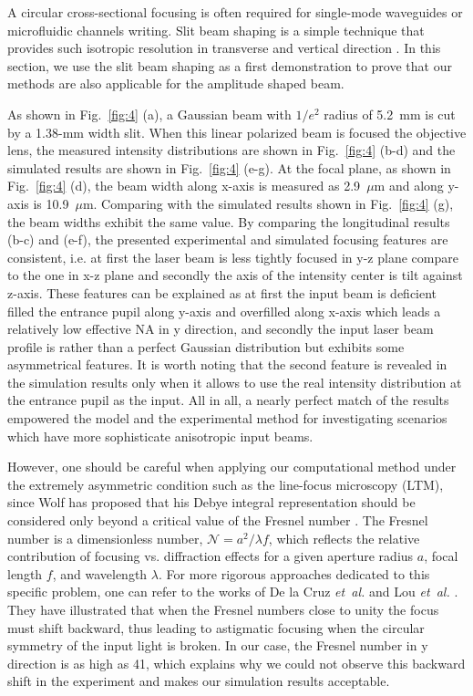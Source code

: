 \documentclass[9pt,twocolumn,twoside]{osajnl}
\begin{document}
A circular cross-sectional focusing is often required for single-mode waveguides or microfluidic channels writing. Slit beam shaping is a simple technique that provides such isotropic resolution in transverse and vertical direction \cite{cheng2003control, ams2005slit}. In this section, we use the slit beam shaping as a first demonstration to prove that our methods are also applicable for the amplitude shaped beam. 

As shown in Fig.~\ref{fig:4} (a), a Gaussian beam with $1/e^2$ radius of 5.2~mm is cut by a 1.38-mm width slit. When this linear polarized beam is focused the objective lens, the measured intensity distributions are shown in Fig.~\ref{fig:4} (b-d) and the simulated results are shown in Fig.~\ref{fig:4} (e-g). At the focal plane, as shown in Fig.~\ref{fig:4} (d), the beam width along x-axis is measured as 2.9~$\mu$m and along y-axis is 10.9~$\mu$m. Comparing with the simulated results shown in Fig.~\ref{fig:4} (g), the beam widths exhibit the same value. By comparing the longitudinal results (b-c) and (e-f), the presented experimental and simulated focusing features are consistent, i.e. at first the laser beam is less tightly focused in y-z plane compare to the one in x-z plane and secondly the axis of the intensity center is tilt against z-axis. These features can be explained as at first the input beam is deficient filled the entrance pupil along y-axis and overfilled along x-axis which leads a relatively low effective NA in y direction, and secondly the input laser beam profile is rather than a perfect Gaussian distribution but exhibits some asymmetrical features. It is worth noting that the second feature is revealed in the simulation results only when it allows to use the real intensity distribution at the entrance pupil as the input. All in all, a nearly perfect match of the results empowered the model and the experimental method for investigating scenarios which have more sophisticate anisotropic input beams. 

However, one should be careful when applying our computational method under the extremely asymmetric condition such as the line-focus microscopy (LTM), since Wolf has proposed that his Debye integral representation should be considered only beyond a critical value of the Fresnel number \cite{wolf1981conditions}. The Fresnel number is a dimensionless number, $\mathcal{N} = a^2/\lambda f$, which reflects the relative contribution of focusing vs. diffraction effects for a given aperture radius $a$, focal length $f$, and wavelength $\lambda$. For more rigorous approaches dedicated to this specific problem, one can refer to the works of De la Cruz \emph{et~al.} \cite{de2011modeling} and Lou \emph{et~al.} \cite{lou2018better}. They have illustrated that when the Fresnel numbers close to unity the focus must shift backward, thus leading to astigmatic focusing when the circular symmetry of the input light is broken. In our case, the Fresnel number in y direction is as high as 41, which explains why we could not observe this backward shift in the experiment and makes our simulation results acceptable.  
\end{document}
